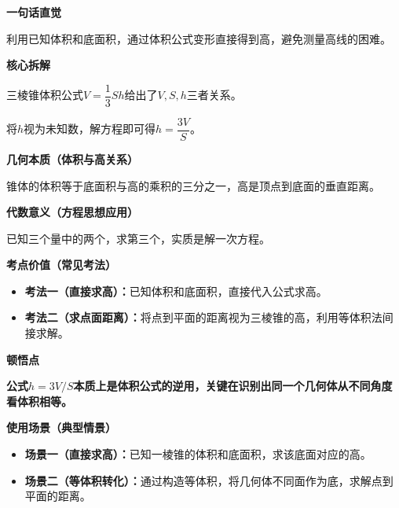 \begin{explanationbox}

	\textbf{\textcolor{CExplanation}{一句话直觉}}

	利用已知体积和底面积，通过体积公式变形直接得到高，避免测量高线的困难。

	\medskip
	\textbf{\textcolor{CExplanation}{核心拆解}}
	\begin{description}[style=nextline, leftmargin=2.8em, labelsep=0.5em, itemsep=0.45em]
		\item[\textbf{要点一（体积公式变形）：}] 三棱锥体积公式$V=\dfrac13Sh$给出了$V,S,h$三者关系。
		\item[\textbf{要点二（方程反解）：}] 将$h$视为未知数，解方程即可得$h=\dfrac{3V}{S}$。
	\end{description}

	\medskip
	\textbf{\textcolor{CExplanation}{几何本质（体积与高关系）}}

	锥体的体积等于底面积与高的乘积的三分之一，高是顶点到底面的垂直距离。

	\medskip
	\textbf{\textcolor{CExplanation}{代数意义（方程思想应用）}}

	已知三个量中的两个，求第三个，实质是解一次方程。

	\medskip
	\textbf{\textcolor{CExplanation}{考点价值（常见考法）}}
	\begin{itemize}[leftmargin=*, itemsep=0.5em, topsep=0.4em]
		\item \textbf{考法一（直接求高）：}已知体积和底面积，直接代入公式求高。
		\item \textbf{考法二（求点面距离）：}将点到平面的距离视为三棱锥的高，利用等体积法间接求解。
	\end{itemize}

	\medskip
	\textbf{\textcolor{CExplanation}{顿悟点}}

	\textbf{公式$h=3V/S$本质上是体积公式的逆用，关键在识别出同一个几何体从不同角度看体积相等。}

	\medskip
	\textbf{\textcolor{CExplanation}{使用场景（典型情景）}}
	\begin{itemize}[leftmargin=*, itemsep=0.5em, topsep=0.4em]
		\item \textbf{场景一（直接求高）：}已知一棱锥的体积和底面积，求该底面对应的高。
		\item \textbf{场景二（等体积转化）：}通过构造等体积，将几何体不同面作为底，求解点到平面的距离。
	\end{itemize}
\end{explanationbox}
